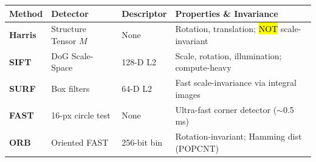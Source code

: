 \begin{mem}
\begin{tabularx}{\columnwidth}{@{}l l l X@{}}
\toprule
\textbf{Method} & \textbf{Detector} & \textbf{Descriptor} & \textbf{Properties \& Invariance} \\
\midrule
\textbf{Harris} & Structure Tensor $M$ & None & Rotation, translation; \hl{NOT} scale-invariant \\
\textbf{SIFT} & DoG Scale-Space & 128-D L2 & Scale, rotation, illumination; compute-heavy \\
\textbf{SURF} & Box filters & 64-D L2 & Fast scale-invariance via integral images \\
\textbf{FAST} & 16-px circle test & None & Ultra-fast corner detector ($\sim$0.5\,ms) \\
\textbf{ORB} & Oriented FAST & 256-bit bin & Rotation-invariant; Hamming dist (POPCNT) \\
\bottomrule
\end{tabularx}
\end{mem}

